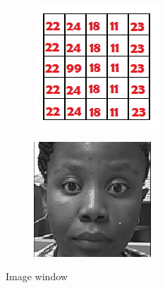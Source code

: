 \begin{figure}[H]
\centering
\begin{subfigure}{.5\textwidth}
  \centering
  \includegraphics[width=.5\linewidth]{im}
  \label{fig:sub1}
\end{subfigure}%
\begin{subfigure}{.5\textwidth}
  \centering
  \includegraphics[width=.5\linewidth]{roi}
  \label{fig:sub2}
\end{subfigure}
\caption{Image window}
\label{fig:test}
\end{figure}
